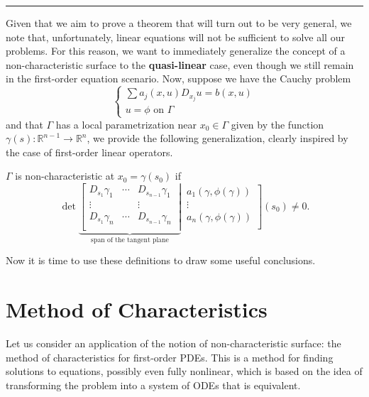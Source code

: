 \noindent\rule[0.5ex]{\linewidth}{0.2pt}
Given that we aim to prove a theorem that will turn out to be very general, we note that, unfortunately, linear equations will not be sufficient to solve all our problems. For this reason, we want to immediately generalize the concept of a non-characteristic surface to the \textbf{quasi-linear} case, even though we still remain in the first-order equation scenario. Now, suppose we have the Cauchy problem
\begin{equation}
\begin{cases}
\sum a_j(x,u)D_{x_j} u = b(x,u)\\
u = \phi \text{ on } \Gamma
\end{cases}
\end{equation}
and that $\Gamma$ has a local parametrization near $x_0\in \Gamma$ given by the function $\gamma (s): \mathbb{R}^{n-1}\rightarrow \mathbb{R}^n$, we provide the following generalization, clearly inspired by the case of first-order linear operators.
\begin{definition}
$\Gamma$ is non-characteristic at $x_0=\gamma (s_0)$ if\\
\begin{equation*}
\det
\underbrace{
\left[
\begin{matrix}
D_{s_1}\gamma_1 & \cdots & D_{s_{n-1}}\gamma_1 \\
\vdots &  & \vdots \\
D_{s_1}\gamma_n & \cdots & D_{s_{n-1}}\gamma_n \\
\end{matrix}\;\right|}_{\text{span of the tangent plane}} \,
\left.
\begin{matrix}
a_1(\gamma, \phi(\gamma))\\
\vdots\\
a_n(\gamma, \phi(\gamma))\\
\end{matrix}\right] (s_0) \neq 0.
\end{equation*}
\end{definition}
Now it is time to use these definitions to draw some useful conclusions.


\newpage
\section{Method of Characteristics}\label{metodocar}
Let us consider an application of the notion of non-characteristic surface: the method of characteristics for first-order PDEs. 
This is a method for finding solutions to equations, possibly even fully nonlinear, which is based on the idea of transforming the problem into a system of ODEs that is equivalent.


